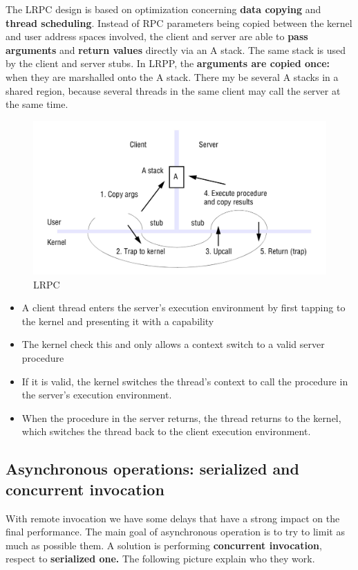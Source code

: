 The LRPC design is based on optimization concerning \textbf{data copying} and \textbf{thread scheduling}. Instead of RPC parameters being copied between the kernel and user address spaces involved, the client and server are able to \textbf{pass arguments} and \textbf{return values} directly via an A stack.  The same stack is used by the client and server stubs. In LRPP, the \textbf{arguments are copied once:} when they are marshalled onto the A stack. There my be several A stacks in a shared region, because several threads in the same client may call the server at the same time.

\begin{figure}[!h]
    \centering
    \includegraphics[width=.7\linewidth]{images/OperatingSystemSupport/LRPC.jpeg}
    \caption{LRPC}
\end{figure}

\begin{itemize}
    \item A client thread enters the server's execution environment by first tapping to the kernel and presenting it with a capability
    \item The kernel check this and only allows a context switch to a valid server procedure
    \item If it is valid, the kernel switches the thread's context to call the procedure in the server's execution environment.
    \item When the procedure in the server returns, the thread returns to the kernel, which switches the thread back to the client execution environment.
\end{itemize}

\subsection{Asynchronous operations: serialized and concurrent invocation}
With remote invocation we have some delays that have a strong impact on the final performance. The main goal of asynchronous operation is to try to limit as much as possible them. A solution is performing \textbf{concurrent invocation}, respect to \textbf{serialized one.} The following picture explain who they work.

